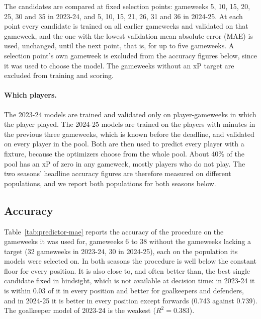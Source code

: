 \documentclass[12pt,oneside,a4paper]{book}
\theoremstyle{definition}
\theoremstyle{remark}
\begin{document}
	The candidates are compared at fixed selection points: gameweeks 5, 10, 15, 20, 25, 30 and 35
	in 2023-24, and 5, 10, 15, 21, 26, 31 and 36 in 2024-25. At each point every candidate is
	trained on all earlier gameweeks and validated on that gameweek, and the one with the lowest
	validation mean absolute error (MAE) is used, unchanged, until the next point, that is, for up
	to five gameweeks. A selection point's own gameweek is excluded from the accuracy figures below,
	since it was used to choose the model. The gameweeks without an xP target are excluded from
	training and scoring.

	\paragraph{Which players.} The 2023-24 models are trained and validated only on player-gameweeks
	in which the player played. The 2024-25 models are trained on the players with minutes in the
	previous three gameweeks, which is known before the deadline, and validated on every player in
	the pool. Both are then used to predict every player with a fixture, because the optimizers
	choose from the whole pool. About 40\% of the pool has an xP of zero in any gameweek, mostly
	players who do not play. The two seasons' headline accuracy figures are therefore measured on
	different populations, and we report both populations for both seasons below.

	\subsection{Accuracy}
	\label{sec:predictions-accuracy}

	Table~\ref{tab:predictor-mae} reports the accuracy of the procedure on the gameweeks it was
	used for, gameweeks 6 to 38 without the gameweeks lacking a target (32 gameweeks in 2023-24, 30
	in 2024-25), each on the population its models were selected on. In both seasons the procedure
	is well below the constant floor for every position. It is also close to, and often better
	than, the best single candidate fixed in hindsight, which is not available at decision time:
	in 2023-24 it is within 0.03 of it in every position and better for goalkeepers and defenders,
	and in 2024-25 it is better in every position except forwards (0.743 against 0.739). The
	goalkeeper model of 2023-24 is the weakest ($R^2=0.383$).
\end{document}
